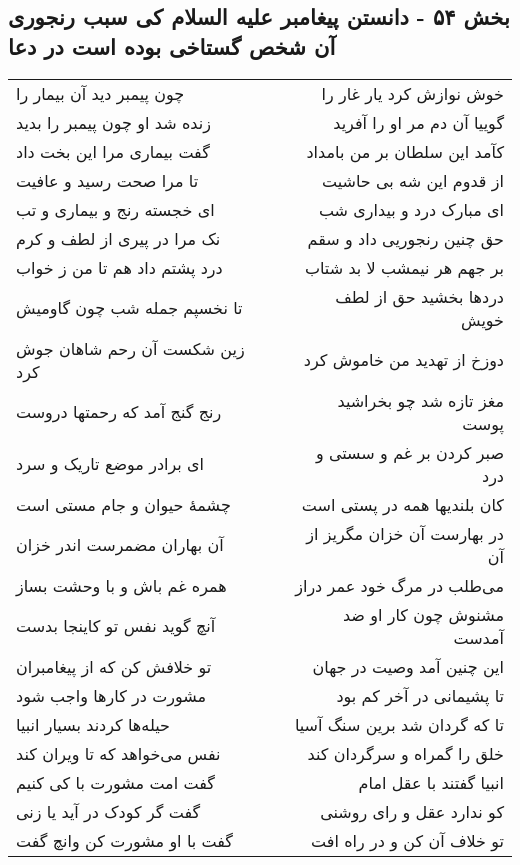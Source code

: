 \begin{center}
\section*{بخش ۵۴ - دانستن پیغامبر علیه السلام کی سبب رنجوری آن شخص گستاخی بوده است در دعا}
\label{sec:sh054}
\begin{longtable}{l p{0.5cm} r}
چون پیمبر دید آن بیمار را
&&
خوش نوازش کرد یار غار را
\\
زنده شد او چون پیمبر را بدید
&&
گوییا آن دم مر او را آفرید
\\
گفت بیماری مرا این بخت داد
&&
کآمد این سلطان بر من بامداد
\\
تا مرا صحت رسید و عافیت
&&
از قدوم این شه بی حاشیت
\\
ای خجسته رنج و بیماری و تب
&&
ای مبارک درد و بیداری شب
\\
نک مرا در پیری از لطف و کرم
&&
حق چنین رنجوریی داد و سقم
\\
درد پشتم داد هم تا من ز خواب
&&
بر جهم هر نیمشب لا بد شتاب
\\
تا نخسپم جمله شب چون گاومیش
&&
دردها بخشید حق از لطف خویش
\\
زین شکست آن رحم شاهان جوش کرد
&&
دوزخ از تهدید من خاموش کرد
\\
رنج گنج آمد که رحمتها دروست
&&
مغز تازه شد چو بخراشید پوست
\\
ای برادر موضع تاریک و سرد
&&
صبر کردن بر غم و سستی و درد
\\
چشمهٔ حیوان و جام مستی است
&&
کان بلندیها همه در پستی است
\\
آن بهاران مضمرست اندر خزان
&&
در بهارست آن خزان مگریز از آن
\\
همره غم باش و با وحشت بساز
&&
می‌طلب در مرگ خود عمر دراز
\\
آنچ گوید نفس تو کاینجا بدست
&&
مشنوش چون کار او ضد آمدست
\\
تو خلافش کن که از پیغامبران
&&
این چنین آمد وصیت در جهان
\\
مشورت در کارها واجب شود
&&
تا پشیمانی در آخر کم بود
\\
حیله‌ها کردند بسیار انبیا
&&
تا که گردان شد برین سنگ آسیا
\\
نفس می‌خواهد که تا ویران کند
&&
خلق را گمراه و سرگردان کند
\\
گفت امت مشورت با کی کنیم
&&
انبیا گفتند با عقل امام
\\
گفت گر کودک در آید یا زنی
&&
کو ندارد عقل و رای روشنی
\\
گفت با او مشورت کن وانچ گفت
&&
تو خلاف آن کن و در راه افت

\end{longtable}
\end{center}
